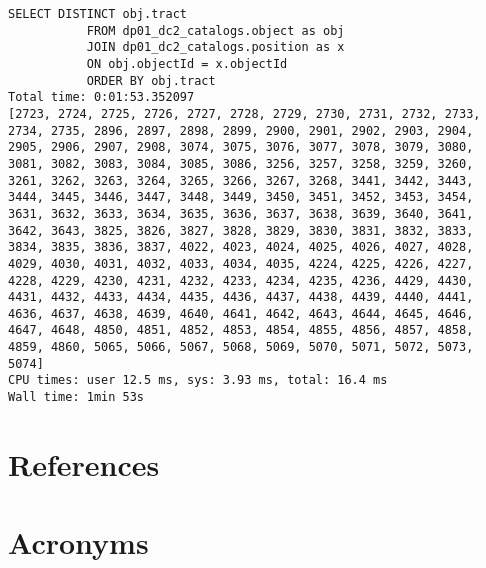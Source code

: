 \documentclass[DM,authoryear,toc]{lsstdoc}
\newenvironment{allintypewriter}{\ttfamily}{\par}
\begin{document}
\lstset{language=sh}
\begin{lstlisting}
SELECT DISTINCT obj.tract 
           FROM dp01_dc2_catalogs.object as obj
           JOIN dp01_dc2_catalogs.position as x
           ON obj.objectId = x.objectId  
           ORDER BY obj.tract
Total time: 0:01:53.352097
[2723, 2724, 2725, 2726, 2727, 2728, 2729, 2730, 2731, 2732, 2733, 2734, 2735, 2896, 2897, 2898, 2899, 2900, 2901, 2902, 2903, 2904, 2905, 2906, 2907, 2908, 3074, 3075, 3076, 3077, 3078, 3079, 3080, 3081, 3082, 3083, 3084, 3085, 3086, 3256, 3257, 3258, 3259, 3260, 3261, 3262, 3263, 3264, 3265, 3266, 3267, 3268, 3441, 3442, 3443, 3444, 3445, 3446, 3447, 3448, 3449, 3450, 3451, 3452, 3453, 3454, 3631, 3632, 3633, 3634, 3635, 3636, 3637, 3638, 3639, 3640, 3641, 3642, 3643, 3825, 3826, 3827, 3828, 3829, 3830, 3831, 3832, 3833, 3834, 3835, 3836, 3837, 4022, 4023, 4024, 4025, 4026, 4027, 4028, 4029, 4030, 4031, 4032, 4033, 4034, 4035, 4224, 4225, 4226, 4227, 4228, 4229, 4230, 4231, 4232, 4233, 4234, 4235, 4236, 4429, 4430, 4431, 4432, 4433, 4434, 4435, 4436, 4437, 4438, 4439, 4440, 4441, 4636, 4637, 4638, 4639, 4640, 4641, 4642, 4643, 4644, 4645, 4646, 4647, 4648, 4850, 4851, 4852, 4853, 4854, 4855, 4856, 4857, 4858, 4859, 4860, 5065, 5066, 5067, 5068, 5069, 5070, 5071, 5072, 5073, 5074]
CPU times: user 12.5 ms, sys: 3.93 ms, total: 16.4 ms
Wall time: 1min 53s
\end{lstlisting}

\appendix
\section{References} \label{sec:bib}
\renewcommand{\refname}{} %


\section{Acronyms} \label{sec:acronyms}

\end{document}
